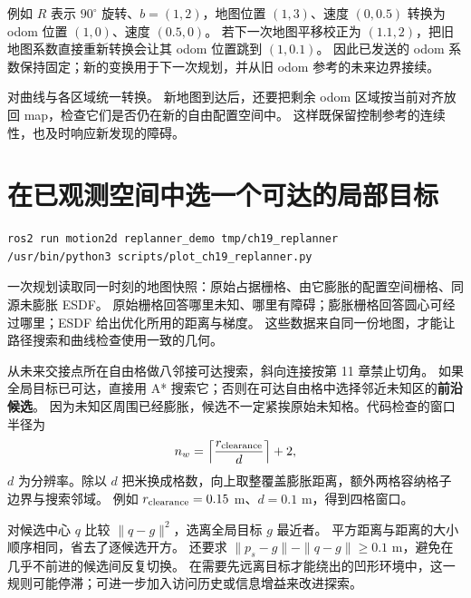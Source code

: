 例如 $R$ 表示 $90^\circ$ 旋转、$b=(1,2)$，地图位置 $(1,3)$、速度 $(0,0.5)$
转换为 odom 位置 $(1,0)$、速度 $(0.5,0)$。
若下一次地图平移校正为 $(1.1,2)$，把旧地图系数直接重新转换会让其 odom 位置跳到 $(1,0.1)$。
因此已发送的 odom 系数保持固定；新的变换用于下一次规划，并从旧 odom 参考的未来边界接续。

 对曲线与各区域统一转换。
新地图到达后，还要把剩余 odom 区域按当前对齐放回 map，检查它们是否仍在新的自由配置空间中。
这样既保留控制参考的连续性，也及时响应新发现的障碍。

\section{在已观测空间中选一个可达的局部目标}
\begin{lstlisting}[language=bash,numbers=none]
ros2 run motion2d replanner_demo tmp/ch19_replanner
/usr/bin/python3 scripts/plot_ch19_replanner.py
\end{lstlisting}
一次规划读取同一时刻的地图快照：原始占据栅格、由它膨胀的配置空间栅格、同源未膨胀 ESDF。
原始栅格回答哪里未知、哪里有障碍；膨胀栅格回答圆心可经过哪里；ESDF 给出优化所用的距离与梯度。
这些数据来自同一份地图，才能让路径搜索和曲线检查使用一致的几何。

从未来交接点所在自由格做八邻接可达搜索，斜向连接按第 11 章禁止切角。
如果全局目标已可达，直接用 A* 搜索它；否则在可达自由格中选择邻近未知区的\textbf{前沿候选}。
因为未知区周围已经膨胀，候选不一定紧挨原始未知格。代码检查的窗口半径为
\[
 n_w=\left\lceil\frac{r_{\rm clearance}}{d}\right\rceil+2,
\]
$d$ 为分辨率。除以 $d$ 把米换成格数，向上取整覆盖膨胀距离，额外两格容纳格子边界与搜索邻域。
例如 $r_{\rm clearance}=0.15$ m、$d=0.1$ m，得到四格窗口。

对候选中心 $q$ 比较 $\|q-g\|^2$，选离全局目标 $g$ 最近者。
平方距离与距离的大小顺序相同，省去了逐候选开方。
还要求 $\|p_s-g\|-\|q-g\|\geq0.1$ m，避免在几乎不前进的候选间反复切换。
在需要先远离目标才能绕出的凹形环境中，这一规则可能停滞；可进一步加入访问历史或信息增益来改进探索。

